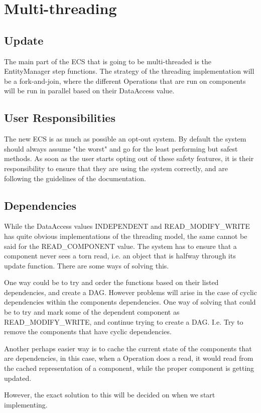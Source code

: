 \section{Multi-threading}
\subsection{Update}
The main part of the ECS that is going to be multi-threaded is the EntityManager step functions.
The strategy of the threading implementation will be a fork-and-join\cite{wikipedia_fork_and_join}, 
where the different Operations that are run on components will be run in parallel based on their DataAccess value.

\subsection{User Responsibilities}
The new ECS is as much as possible an opt-out system. By default the system should always assume "the worst" and go for the least performing but safest methods. 
As soon as the user starts opting out of these safety features, 
it is their responsibility to ensure that they are using the system correctly, and are following the guidelines of the documentation.

\subsection{Dependencies}
While the DataAccess values INDEPENDENT and READ\_MODIFY\_WRITE has quite obvious implementations of the threading model, 
the same cannot be said for the READ\_COMPONENT value. 
The system has to ensure that a component never sees a torn read, i.e. an object that is halfway through its update function.
There are some ways of solving this.

One way could be to try and order the functions based on their listed dependencies, and create a DAG. 
However problems will arise in the case of cyclic dependencies within the components dependencies. 
One way of solving that could be to try and mark some of the dependent component as READ\_MODIFY\_WRITE, and continue trying to create a DAG. I.e. Try to remove the components that have cyclic dependencies.

Another perhaps easier way is to cache the current state of the components that are dependencies, in this case, when a Operation does a read, it would read from the cached representation of a component, while the proper component is getting updated.

However, the exact solution to this will be decided on when we start implementing.
